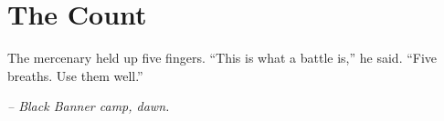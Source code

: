 \chapter*{The Count}

The mercenary held up five fingers. ``This is what a battle is,'' he said. ``Five breaths. Use them well.''

\smallskip

\noindent \textit{-- Black Banner camp, dawn.}

